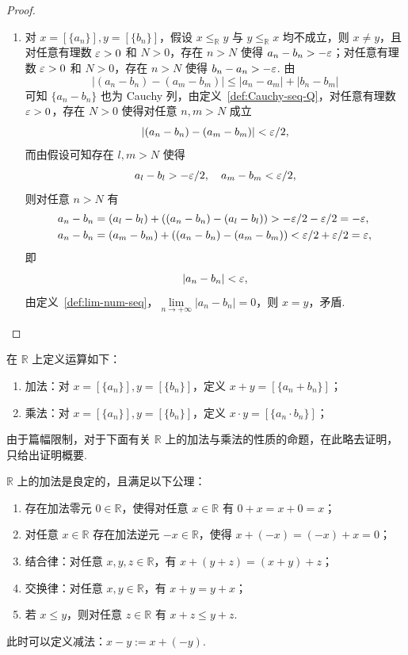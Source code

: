 \documentclass[../main.tex]{subfiles}
\begin{document}
\begin{proof}
\begin{enumerate}[label=(\alph*)]
        \item 对 $x = [\{a_n\}], y = [\{b_n\}]$，假设 $x \leqslant_{\mathbb R} y$ 与 $y \leqslant_{\mathbb R} x$ 均不成立，则 $x \neq y$，且对任意有理数 $\varepsilon > 0$ 和 $N > 0$，存在 $n > N$ 使得 $a_n - b_n > -\varepsilon$；对任意有理数 $\varepsilon > 0$ 和 $N > 0$，存在 $n > N$ 使得 $b_n - a_n > -\varepsilon$. 由
        $$
        |(a_n - b_n) - (a_m - b_m)| \leqslant |a_n - a_m| + |b_n - b_m|
        $$
        可知 $\{a_n - b_n\}$ 也为 Cauchy 列，由定义~\ref{def:Cauchy-seq-Q}，对任意有理数 $\varepsilon > 0$，存在 $N > 0$ 使得对任意 $n, m > N$ 成立
        $$
        |(a_n - b_n) - (a_m - b_m)| < \varepsilon / 2, 
        $$
        而由假设可知存在 $l, m > N$ 使得
        $$
        a_l - b_l > -\varepsilon / 2, \quad a_m - b_m < \varepsilon / 2, 
        $$
        则对任意 $n > N$ 有
        \begin{align*}
            a_n - b_n &= (a_l - b_l) + ((a_n - b_n) - (a_l - b_l)) > -\varepsilon / 2 - \varepsilon / 2 = -\varepsilon,  \\
            a_n - b_n &= (a_m - b_m) + ((a_n - b_n) - (a_m - b_m)) < \varepsilon / 2 + \varepsilon / 2 = \varepsilon, 
        \end{align*}
        即
        $$
        |a_n - b_n| < \varepsilon, 
        $$
        由定义~\ref{def:lim-num-seq}，$\lim\limits_{n \to +\infty} |a_n - b_n| = 0$，则 $x = y$，矛盾. \qedhere
    \end{enumerate}
\end{proof}

\begin{definition}
    在 $\mathbb R$ 上定义运算如下：
    \begin{enumerate}[label=(\alph*)]
        \item 加法：对 $x = [\{a_n\}], y = [\{b_n\}]$，定义 $x + y = [\{a_n + b_n\}]$；
        \item 乘法：对 $x = [\{a_n\}], y = [\{b_n\}]$，定义 $x \cdot y = [\{a_n \cdot b_n\}]$；
    \end{enumerate}
\end{definition}

由于篇幅限制，对于下面有关 $\mathbb R$ 上的加法与乘法的性质的命题，在此略去证明，只给出证明概要. 

\begin{proposition} \label{prop:plus-R}
    $\mathbb R$ 上的加法是良定的，且满足以下公理：
    \begin{enumerate}[label=(\alph*)]
        \item 存在加法零元 $0 \in \mathbb R$，使得对任意 $x \in \mathbb R$ 有 $0 + x = x + 0 = x$；
        \item 对任意 $x \in \mathbb R$ 存在加法逆元 $-x \in \mathbb R$，使得 $x + (-x) = (-x) + x = 0$；
        \item 结合律：对任意 $x, y, z \in \mathbb R$，有 $x + (y + z) = (x + y) + z$；
        \item 交换律：对任意 $x, y \in \mathbb R$，有 $x + y = y + x$；
        \item 若 $x \leqslant y$，则对任意 $z \in \mathbb R$ 有 $x + z \leqslant y + z$. 
    \end{enumerate}
    此时可以定义减法：$x - y := x + (-y)$. 
\end{proposition}
\end{document}
